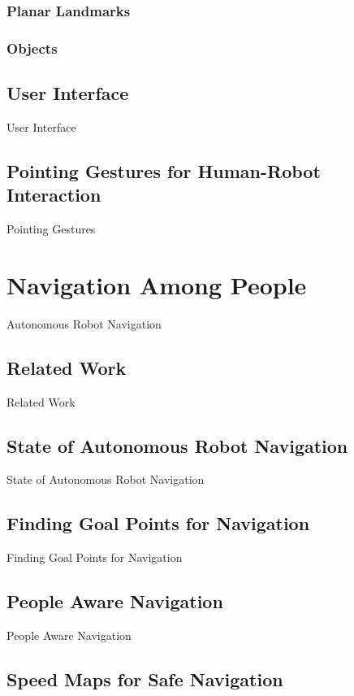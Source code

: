 \documentclass[12pt]{gatech-thesis}
\begin{document}
\subsection{Planar Landmarks}

\subsection{Objects}


\section{User Interface}

User Interface


\section{Pointing Gestures for Human-Robot Interaction}

Pointing Gestures

\chapter{Navigation Among People}

Autonomous Robot Navigation

\section{Related Work}

Related Work

\section{State of Autonomous Robot Navigation}

State of Autonomous Robot Navigation

\section{Finding Goal Points for Navigation}

Finding Goal Points for Navigation

\section{People Aware Navigation}

People Aware Navigation

\section{Speed Maps for Safe Navigation}
\end{document}
